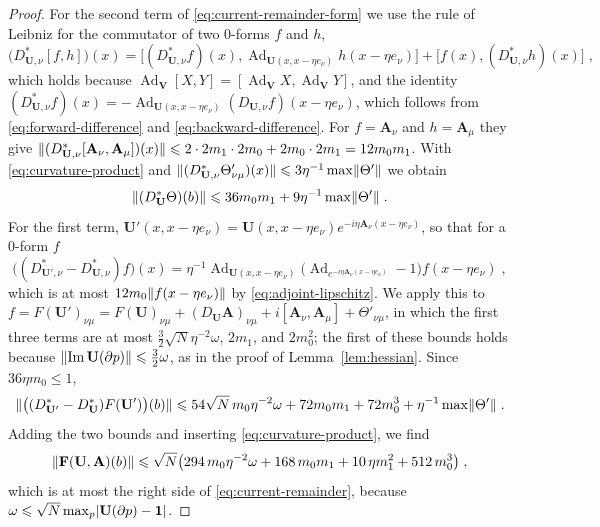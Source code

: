 \documentclass[11pt]{preprint}
\newcommand{\id}{\mathbf 1}
\newcommand{\im}{\operatorname{Im}}
\newcommand{\Ad}{\operatorname{Ad}}
\DeclarePairedDelimiter{\abs}{\lvert}{\rvert}
\DeclarePairedDelimiter{\norm}{\lVert}{\rVert}
\numberwithin{equation}{section}
\begin{document}
\begin{proof}
For the second term of \eqref{eq:current-remainder-form} we use the rule of Leibniz for the commutator of two $0$-forms $f$ and $h$,
\[
    \bigl(D^*_{\mathbf U,\nu}[f, h]\bigr)(x) = \bigl[(D^*_{\mathbf U,\nu}f)(x), \Ad_{\mathbf U(x, x - \eta e_\nu)}h(x - \eta e_\nu)\bigr] + \bigl[f(x), (D^*_{\mathbf U,\nu}h)(x)\bigr]\;,
\]
which holds because $\Ad_{\mathbf V}[X, Y] = [\Ad_{\mathbf V}X, \Ad_{\mathbf V}Y]$, and the identity $(D^*_{\mathbf U,\nu}f)(x) = -\Ad_{\mathbf U(x, x - \eta e_\nu)}(D_{\mathbf U,\nu}f)(x - \eta e_\nu)$, which follows from \eqref{eq:forward-difference} and \eqref{eq:backward-difference}. For $f = \mathbf A_\nu$ and $h = \mathbf A_\mu$ they give $\norm{(D^*_{\mathbf U,\nu}[\mathbf A_\nu, \mathbf A_\mu])(x)} \leqslant 2 \cdot 2m_1 \cdot 2m_0 + 2m_0 \cdot 2m_1 = 12m_0m_1$. With \eqref{eq:curvature-product} and $\norm{(D^*_{\mathbf U,\nu}\Theta'_{\nu\mu})(x)} \leqslant 3\eta^{-1}\max\norm{\Theta'}$ we obtain
\[
    \norm{(D^*_{\mathbf U}\Theta)(b)} \leqslant 36m_0m_1 + 9\eta^{-1}\max\norm{\Theta'}\;.
\]
For the first term, $\mathbf U'(x, x - \eta e_\nu) = \mathbf U(x, x - \eta e_\nu)e^{-i\eta\mathbf A_\nu(x - \eta e_\nu)}$, so that for a $0$-form $f$
\[
    \bigl((D^*_{\mathbf U',\nu} - D^*_{\mathbf U,\nu})f\bigr)(x) = \eta^{-1}\Ad_{\mathbf U(x, x - \eta e_\nu)}\bigl(\Ad_{e^{-i\eta\mathbf A_\nu(x - \eta e_\nu)}} - 1\bigr)f(x - \eta e_\nu)\;,
\]
which is at most $12m_0\norm{f(x - \eta e_\nu)}$ by \eqref{eq:adjoint-lipschitz}. We apply this to $f = F(\mathbf U')_{\nu\mu} = F(\mathbf U)_{\nu\mu} + (D_{\mathbf U}\mathbf A)_{\nu\mu} + i[\mathbf A_\nu, \mathbf A_\mu] + \Theta'_{\nu\mu}$, in which the first three terms are at most $\frac{3}{2}\sqrt N\eta^{-2}\omega$, $2m_1$, and $2m_0^2$; the first of these bounds holds because $\norm{\im\mathbf U(\partial p)} \leqslant \frac{3}{2}\omega$, as in the proof of Lemma~\ref{lem:hessian}. Since $36\eta m_0 \leqslant 1$,
\[
    \norm{\bigl((D^*_{\mathbf U'} - D^*_{\mathbf U})F(\mathbf U')\bigr)(b)} \leqslant 54\sqrt N\,m_0\eta^{-2}\omega + 72m_0m_1 + 72m_0^3 + \eta^{-1}\max\norm{\Theta'}\;.
\]
Adding the two bounds and inserting \eqref{eq:curvature-product}, we find
\[
    \norm{\mathbf F(\mathbf U, \mathbf A)(b)} \leqslant \sqrt N\bigl(294\,m_0\eta^{-2}\omega + 168\,m_0m_1 + 10\,\eta m_1^2 + 512\,m_0^3\bigr)\;,
\]
which is at most the right side of \eqref{eq:current-remainder}, because $\omega \leqslant \sqrt N\max_p\abs{\mathbf U(\partial p) - \id}$.


\end{proof}
\end{document}
